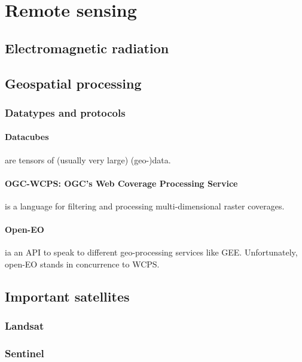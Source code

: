 \section{Remote sensing}

\subsection{Electromagnetic radiation}



\subsection{Geospatial processing}

\subsubsection{Datatypes and protocols}

\paragraph{Datacubes} are tensors of (usually very large) (geo-)data.

\paragraph{OGC-WCPS: OGC's Web Coverage Processing Service} is a language for filtering and processing multi-dimensional raster coverages. 

\paragraph{Open-EO} ia an API to speak to different geo-processing services like GEE. Unfortunately, open-EO stands in concurrence to WCPS. 



\subsection{Important satellites}

\subsubsection{Landsat}

\subsubsection{Sentinel}

